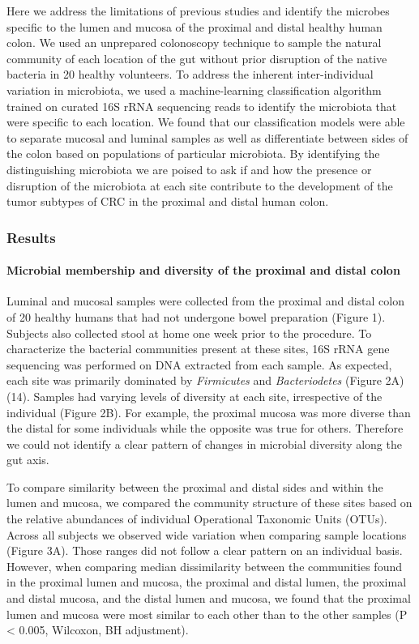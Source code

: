 \documentclass[12pt,]{article}
\let\oldparagraph\paragraph
\renewcommand{\paragraph}[1]{\oldparagraph{#1}\mbox{}}
\begin{document}
Here we address the limitations of previous studies and identify the
microbes specific to the lumen and mucosa of the proximal and distal
healthy human colon. We used an unprepared colonoscopy technique to
sample the natural community of each location of the gut without prior
disruption of the native bacteria in 20 healthy volunteers. To address
the inherent inter-individual variation in microbiota, we used a
machine-learning classification algorithm trained on curated 16S rRNA
sequencing reads to identify the microbiota that were specific to each
location. We found that our classification models were able to separate
mucosal and luminal samples as well as differentiate between sides of
the colon based on populations of particular microbiota. By identifying
the distinguishing microbiota we are poised to ask if and how the
presence or disruption of the microbiota at each site contribute to the
development of the tumor subtypes of CRC in the proximal and distal
human colon.

\subsubsection{Results}\label{results}

\paragraph{Microbial membership and diversity of the proximal and distal
colon}\label{microbial-membership-and-diversity-of-the-proximal-and-distal-colon}

Luminal and mucosal samples were collected from the proximal and distal
colon of 20 healthy humans that had not undergone bowel preparation
(Figure 1). Subjects also collected stool at home one week prior to the
procedure. To characterize the bacterial communities present at these
sites, 16S rRNA gene sequencing was performed on DNA extracted from each
sample. As expected, each site was primarily dominated by
\emph{Firmicutes} and \emph{Bacteriodetes} (Figure 2A) (14). Samples had
varying levels of diversity at each site, irrespective of the individual
(Figure 2B). For example, the proximal mucosa was more diverse than the
distal for some individuals while the opposite was true for others.
Therefore we could not identify a clear pattern of changes in microbial
diversity along the gut axis.

To compare similarity between the proximal and distal sides and within
the lumen and mucosa, we compared the community structure of these sites
based on the relative abundances of individual Operational Taxonomic
Units (OTUs). Across all subjects we observed wide variation when
comparing sample locations (Figure 3A). Those ranges did not follow a
clear pattern on an individual basis. However, when comparing median
dissimilarity between the communities found in the proximal lumen and
mucosa, the proximal and distal lumen, the proximal and distal mucosa,
and the distal lumen and mucosa, we found that the proximal lumen and
mucosa were most similar to each other than to the other samples (P
\textless{} 0.005, Wilcoxon, BH adjustment).
\end{document}
